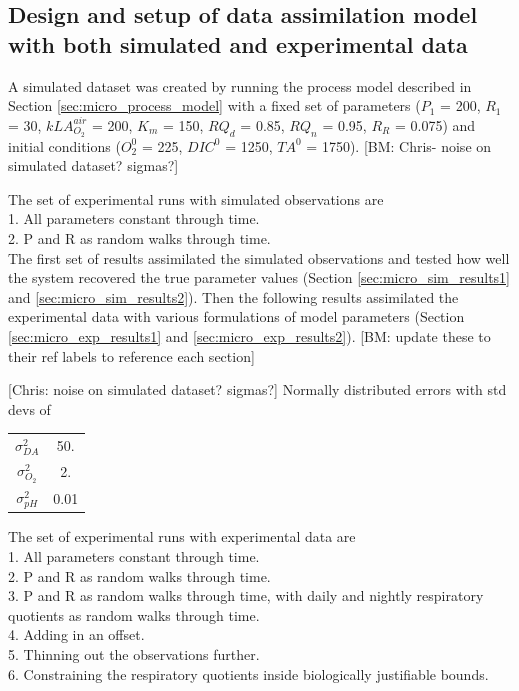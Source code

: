\documentclass{ruthesis}
\begin{document}
\subsection{Design and setup of data assimilation model with both simulated and experimental data}

A simulated dataset was created by running the process model described in Section \ref{sec:micro_process_model} with a fixed set of parameters ($P_1$ = 200, $R_1$ = 30, $kLA_{O_2}^{air}$ = 200, $K_m$ = 150, $RQ_d$ = 0.85, $RQ_n$ = 0.95, $R_R$ = 0.075) and initial conditions ($O_2^0$ = 225, $DIC^0$ = 1250, $TA^0$ = 1750). 
[BM: Chris- noise on simulated dataset? sigmas?]

The set of experimental runs with simulated observations are\\
1. All parameters constant through time.\\
2. P and R as random walks through time.\\

The first set of results assimilated the simulated observations and tested how well the system recovered the true parameter values (Section \ref{sec:micro_sim_results1} and \ref{sec:micro_sim_results2}). Then the following results assimilated the experimental data with various formulations of model parameters (Section \ref{sec:micro_exp_results1} and \ref{sec:micro_exp_results2}). [BM: update these to their ref labels to reference each section]

[Chris: noise on simulated dataset? sigmas?]
Normally distributed errors with std devs of 

\begin{tabular} {|c|c|}
$\sigma^2_{DA}$       &        50.  \\
$\sigma^2_{O_2}$    &           2.   \\
$\sigma^2_{pH}$     &         0.01  \\
\end{tabular}

The set of experimental runs with experimental data are\\
1. All parameters constant through time.\\
2. P and R as random walks through time.\\
3. P and R as random walks through time, with daily and nightly respiratory quotients as random walks through time. \\
4. Adding in an offset.\\
5. Thinning out the observations further.\\
6. Constraining the respiratory quotients inside biologically justifiable bounds.\\
\end{document}
